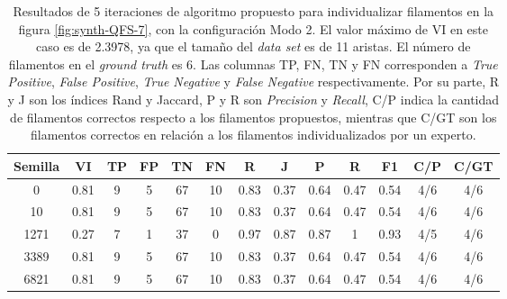 \begin{table}[h]
    \centering
    \begin{tabular}{|c|c|c|c|c|c|c|c|c|c|c|c|c|}
    \hline
        Semilla & VI & TP & FP &TN &FN & R	& J & P & R &F1 & C/P & C/GT \\ \hline 
        0    & 0.81 & 9 & 5 & 67 & 10 & 0.83 & 0.37 & 0.64 & 0.47 & 0.54 & 4/6 & 4/6\\
        10 & 0.81 & 9 & 5 & 67 & 10 & 0.83 & 0.37 & 0.64 & 0.47 & 0.54 & 4/6 & 4/6\\
        1271 & 0.27 & 7 & 1 & 37  & 0  & 0.97 & 0.87 & 0.87 & 1 & 0.93 & 4/5 & 4/6\\
        3389 & 0.81 & 9 & 5 & 67 & 10 & 0.83 & 0.37 & 0.64 & 0.47 & 0.54 & 4/6 & 4/6\\
        6821 & 0.81 & 9 & 5 & 67 & 10 & 0.83 & 0.37 & 0.64 & 0.47 & 0.54 & 4/6 & 4/6\\
        \hline
    \end{tabular}
    \caption{Resultados de 5 iteraciones de algoritmo propuesto para individualizar filamentos en la figura \ref{fig:synth-QFS-7}, con la configuraci\'on Modo 2. El valor m\'aximo de VI en este caso es de 2.3978, ya que el tama\~no del {\it data set} es de 11 aristas. El n\'umero de filamentos en el {\it ground truth} es 6. Las columnas TP, FN, TN y FN corresponden a {\it True Positive}, {\it  False Positive}, {\it True Negative} y {\it False Negative} respectivamente. Por su parte, R y J son los \'indices Rand y Jaccard, P y R son {\it Precision} y {\it Recall}, C/P indica la cantidad de filamentos correctos respecto a los filamentos propuestos, mientras que C/GT son los filamentos correctos en relaci\'on a los filamentos individualizados por un experto.}
    \label{tab:Synth-QuantitativeIFS-Fig7DetailedResults1}
\end{table}


